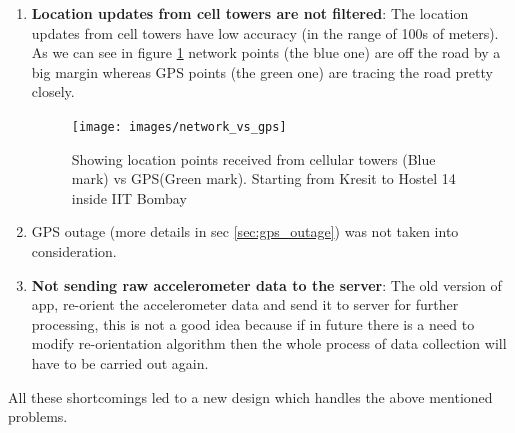\documentclass[12pt]{report}
\begin{document}
\begin{enumerate}
\item \textbf{Location updates from cell towers are not filtered}:
  The location updates from cell towers have low accuracy (in the range of 100s of
  meters). As we can see in figure \ref{network_vs_gps} network points (the blue
  one) are off the road by a big margin whereas GPS points (the green one) are
  tracing the road pretty closely.
  \begin{figure}[h]
    \centering
    \hspace{.2in} \texttt{[image: images/network\_vs\_gps]}
    \caption{Showing location points received from cellular towers (Blue mark)
      vs GPS(Green mark). Starting from Kresit to Hostel 14 inside IIT Bombay}
    \label{network_vs_gps}
  \end{figure}


\item GPS outage (more details in sec \ref{sec:gps_outage}) was not taken into
  consideration.

\item \textbf{Not sending raw accelerometer data to the server}: The old version
  of app, re-orient the accelerometer data and send it to server for further
  processing, this is not a good idea because if in future there is a need to
  modify re-orientation algorithm then the whole process of data collection will
  have to be carried out again.

\end{enumerate}

All these shortcomings led to a new design which handles the above mentioned
problems.




\end{document}
